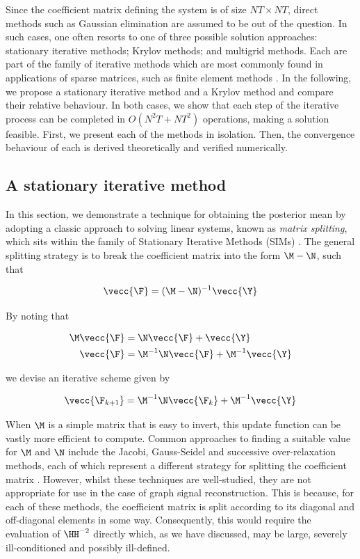 Since the coefficient matrix defining the system is of size $NT \times NT $, direct methods such as Gaussian elimination are assumed to be out of the question. In such cases, one often resorts to one of three possible solution approaches: stationary iterative methods; Krylov methods; and multigrid methods. Each are part of the family of iterative methods which are most commonly found in applications of sparse matrices, such as finite element methods \citep{Brenner2008}. In the following, we propose a stationary iterative method and a Krylov method and compare their relative behaviour. In both cases, we show that each step of the iterative process can be completed in $O(N^2T + NT^2)$ operations, making a solution feasible. First, we present each of the methods in isolation. Then, the convergence behaviour of each is derived theoretically and verified numerically.


\subsection{A stationary iterative method}

\label{sec:SIM}

In this section, we demonstrate a technique for obtaining the posterior mean by adopting a classic approach to solving linear systems, known as \textit{matrix splitting}, which sits within the family of Stationary Iterative Methods (SIMs) \citep{Saad2003}. The general splitting strategy is to break the coefficient matrix into the form $\M - \N$, such that 


\begin{equation}
    \vecc{\F} = (\M - \N)^{-1} \vecc{\Y}
\end{equation}

By noting that

\begin{align}
    \M \vecc{\F} &= \N \vecc{\F} + \vecc{\Y} \\
    \vecc{\F} &= \M^{-1}\N \vecc{\F} + \M^{-1} \vecc{\Y}
\end{align}

we devise an iterative scheme given by 

\begin{equation}
    \label{eq:sim_update}
    \vecc{\F_{k+1}} = \M^{-1}\N \vecc{\F_{k}} + \M^{-1} \vecc{\Y}
\end{equation}


When $\M$ is a simple matrix that is easy to invert, this update function can be vastly more efficient to compute. Common approaches to finding a suitable value for $\M$ and $\N$ include the Jacobi, Gauss-Seidel and successive over-relaxation methods, each of which represent a different strategy for splitting the coefficient matrix \citep{Saad2003}. However, whilst these techniques are well-studied, they are not appropriate for use in the case of graph signal reconstruction. This is because, for each of these methods, the coefficient matrix is split according to its diagonal and off-diagonal elements in some way. Consequently, this would require the evaluation of $\HH^{-2}$ directly which, as we have discussed, may be large, severely ill-conditioned and possibly ill-defined. 


